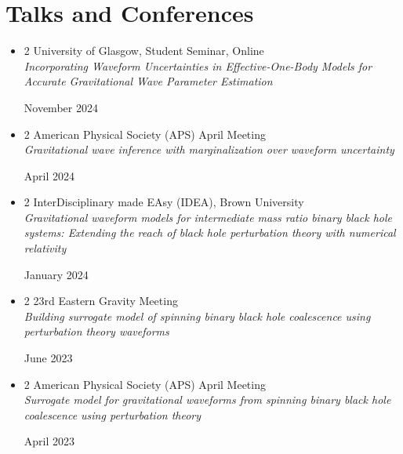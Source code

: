 \documentclass[10pt, letterpaper]{article}
\newenvironment{highlightsforbulletentries}{
    \begin{itemize}[
        topsep=0.10 cm,
        parsep=0.10 cm,
        partopsep=0pt,
        itemsep=0pt,
        leftmargin=10pt
    ]
}{
    \end{itemize}
}
\newenvironment{twocolentry}[2][]{
    \onecolentry
    \def\secondColumn{#2}
    \setcolumnwidth{\fill, 4.5 cm}
    \begin{paracol}{2}
}{
    \switchcolumn \raggedleft \secondColumn
    \end{paracol}
    \endonecolentry
}
\begin{document}
\section{Talks and Conferences}    
\begin{highlightsforbulletentries}
    \item \begin{twocolentry}
        {November 2024}{University of Glasgow, Student Seminar, Online}
        \\\textit{Incorporating Waveform Uncertainties in Effective-One-Body Models for Accurate Gravitational Wave Parameter Estimation}
    \end{twocolentry}

    \item 
    \begin{twocolentry}{April 2024}{American Physical Society (APS) April Meeting}
        \\\textit{Gravitational wave inference with marginalization over waveform uncertainty}
    \end{twocolentry}

    \item \begin{twocolentry}
        {January 2024}{InterDisciplinary made EAsy (IDEA), Brown University}
        \\\textit{Gravitational waveform models for intermediate mass ratio binary black hole systems: Extending the reach of black hole perturbation theory with numerical relativity}
    \end{twocolentry}

    \item 
    \begin{twocolentry}{June 2023}{23rd Eastern Gravity Meeting}
        \\\textit{Building surrogate model of spinning binary black hole coalescence using perturbation theory waveforms}
    \end{twocolentry}

    \item 
    \begin{twocolentry}{April 2023}{American Physical Society (APS) April Meeting}
      \\\textit{Surrogate model for gravitational waveforms from spinning binary black hole coalescence using perturbation theory}
    \end{twocolentry}
\end{highlightsforbulletentries}
\end{document}
